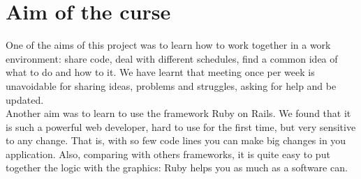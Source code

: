 \section{Aim of the curse}
One of the aims of this project was to learn how to work together in a work environment: share code, deal with different schedules, find a common idea of what to do and how to it. We have learnt that meeting once per week is unavoidable for sharing ideas, problems and struggles, asking for help and be updated.\\
Another aim was to learn to use the framework Ruby on Rails. We found that it is such a powerful web developer, hard to use for the first time, but very sensitive to any change. That is, with so few code lines you can make big changes in you application. Also, comparing with others frameworks, it is quite easy to put together the logic with the graphics: Ruby helps you as much as a software can.